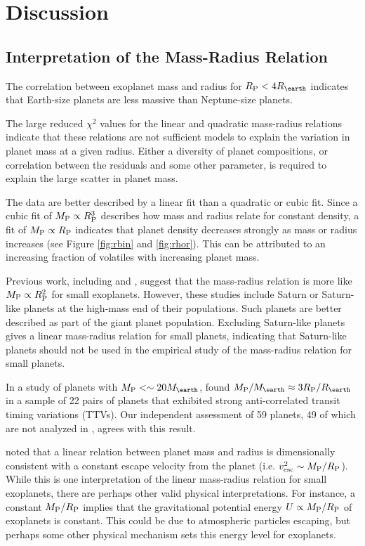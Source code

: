 \documentclass[11pt]{aastex}
\begin{document}
\section{Discussion}
	
\subsection{Interpretation of the Mass-Radius Relation}
The correlation between exoplanet mass and radius for $\rpl < 4 \rearth$ indicates that Earth-size planets are less massive than Neptune-size planets.

The large reduced $\chi^2$ values for the linear and quadratic mass-radius relations indicate that these relations are not sufficient models to explain the variation in planet mass at a given radius.  Either a diversity of planet compositions, or correlation between the residuals and some other parameter, is required to explain the large scatter in planet mass.

The data are better described by a linear fit than a quadratic or cubic fit.  Since a cubic fit of $M_{\rm P} \propto R_{\rm P}^3$ describes how mass and radius relate for constant density, a fit of $M_{\rm P} \propto R_{\rm P}$ indicates that planet density decreases strongly as mass or radius increases (see Figure \ref{fig:rbin} and \ref{fig:rhor}).  This can be attributed to an increasing fraction of volatiles with increasing planet mass.

Previous work, including \citet{Lissauer2011} and \citet{Weiss2013}, suggest that the mass-radius relation is more like $M_{\rm P} \propto R_{\rm P}^2$ for small exoplanets.  However, these studies include Saturn or Saturn-like planets at the high-mass end of their populations.  Such planets are better described as part of the giant planet population.  Excluding Saturn-like planets gives a linear mass-radius relation for small planets, indicating that Saturn-like planets should not be used in the empirical study of the mass-radius relation for small planets.

In a study of planets with $\mpl < \sim20\mearth$, \citet{WL2013} found $\mpl/\mearth \approx 3 \rpl/\rearth$ in a sample of 22 pairs of planets that exhibited strong anti-correlated transit timing variations (TTVs).  Our independent assessment of 59 planets, 49 of which are not analyzed in \citet{WL2013}, agrees with this result.

\citet{WL2013} noted that a linear relation between planet mass and radius is dimensionally consistent with a constant escape velocity from the planet (i.e. $v_{\mathrm{esc}}^2 \sim M_{\rm P}/R_{\rm P}$).  While this is one interpretation of the linear mass-radius relation for small exoplanets, there are perhaps other valid physical interpretations.  For instance, a constant $M_{\rm P}/R_{\rm P}$ implies that the gravitational potential energy $U \propto M_{\rm P}/R_{\rm P}$ of exoplanets is constant.  This could be due to atmospheric particles escaping, but perhaps some other physical mechanism sets this energy level for exoplanets.
\end{document}
